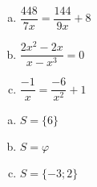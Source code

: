 \begin{secExercicios}
\begin{exer}
    \begin{multicols}{2}
    \begin{enumerate}[a)]
    \item $\dfrac{448}{7x}= \dfrac{144}{9x} + 8$
    \item $\dfrac{2x^2 - 2x}{x - x^3}= 0$
    \item $\dfrac{-1}{x}= \dfrac{-6}{x^2} + 1$
    \end{enumerate}
    \end{multicols}
    \end{exer}
    \begin{resp}
    \begin{multicols}{2}
     \begin{enumerate}[a)]
    \item $S= \{6 \}$
    \item $S= \varphi$
    \item $S= \{-3; 2\}$
    \end{enumerate}
    \end{multicols}
    \end{resp}




\end{secExercicios}



